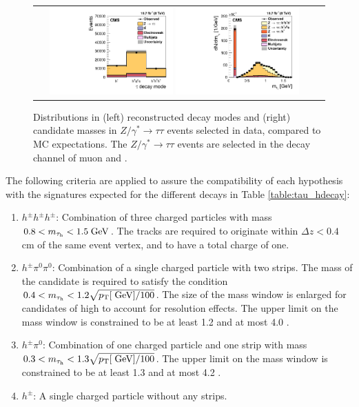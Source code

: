 \begin{figure}[tbh!]
	\centering
	\begin{tabular}{cc}
		\includegraphics[width=0.45\textwidth]{objreconstruction/pics/scalefactors050314.png}
		\includegraphics[width=0.45\textwidth]{objreconstruction/pics/plots_paper_tauIdAlgorithm_ZTT_mTau_ZTT_linear.png} 		
	\end{tabular}
	\caption{Distributions in (left) reconstructed \hadtau decay modes and (right) \hadtau candidate masses in \ensuremath{Z/\gamma^{*} \longrightarrow \tau\tau}  events selected in data, compared to MC expectations. The \ensuremath{Z/\gamma^{*} \longrightarrow \tau\tau}  events are selected in the decay channel of muon and \hadtau \cite{Khachatryan:2015dfa}.}
	\label{fig:Ztautau_decaymodes}
\end{figure}

The following criteria are applied to assure the compatibility of each hypothesis with the signatures expected for the different \hadtau decays in Table \ref{table:tau_hdecay}:

\begin{enumerate}
	\item \ensuremath{h^{\pm}h^{\pm}h^{\pm}}: Combination of three charged particles with mass \ensuremath{0.8 < m_{\hadtau} < 1.5 \gev}. The tracks are required to originate within \ensuremath{\Delta z < 0.4} cm of the same event vertex, and to have a total charge of one.
	\item \ensuremath{h^{\pm}\pi^{0}\pi^{0}}: Combination of a single charged particle with two strips. The mass of the \hadtau candidate is required to satisfy the condition \ensuremath{0.4 < m_{\hadtau} < 1.2 \sqrt{\pt [\gev]/100}}\gev. The size of the mass window is enlarged for \hadtau candidates of high \pt to account for resolution effects. The upper limit on the mass window is constrained to be at least 1.2 and at most 4.0 \gev.
	\item \ensuremath{h^{\pm}\pi^{0}}: Combination of one charged particle and one strip with mass \ensuremath{0.3 < m_{\hadtau} < 1.3 \sqrt{\pt [\gev]/100}}\gev. The upper limit on the mass window is constrained to be at least 1.3 and at most 4.2 \gev.
	\item \ensuremath{h^{\pm}}: A single charged particle without any strips.
\end{enumerate}

